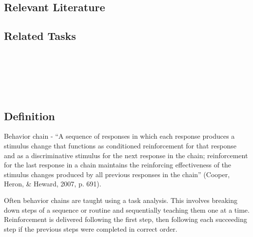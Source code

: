 \subsection{Relevant Literature}
\begin{refsection}
\nocite{test,alang2017police,clayton2018black}
\printbibliography[heading=none]
\end{refsection}
%
\subsection{Related Tasks}
\fourdOne{}\\
\fourdFive{}\\
\fourdTwentyOne{}\\
\fourFKFourtyOne{}\\
%
%
%
%
%
%
%
\section{\fourdSix{}}
\subsection{Definition}  
Behavior chain - ``A sequence of responses in which each response produces a stimulus change that functions as conditioned reinforcement for that response and as a discriminative stimulus for the next response in the chain; reinforcement for the last response in a chain maintains the reinforcing effectiveness of the stimulus changes produced by all previous responses in the chain'' (Cooper, Heron, \& Heward, 2007, p. 691).

Often behavior chains are taught using a task analysis. This involves breaking down steps of a sequence or routine and sequentially teaching them one at a time. Reinforcement is delivered following the first step, then following each succeeding step if the previous steps were completed in correct order.

